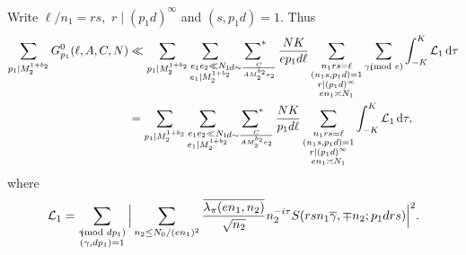 \documentclass[12pt,a4paper,twoside, reqno]{amsart}
\newcommand{\shortmod}{\ensuremath{\negthickspace \negthickspace \negthickspace \pmod}}
\newcommand{\sumstar}{\sideset{}{^*}\sum}
\begin{document}
Write  $\ell/n_1=rs, $ $r \mid (p_1d)^\infty$ and $(s,p_1d)=1$. Thus 
\begin{align}\label{Gp3}
       \sum_{p_1| M_2^{1+b_2}} G_{p_1}^0(\ell, A,C,N)  &\ll   \sum_{p_1| M_2^{1+b_2}}\mathop{\sum_{\substack {e_1e_2 \ll N_1 \\ e_1\mid M_2^{1+b_2} }   }}  \mathop{\sumstar_{ \substack{d \sim \frac{C}{A M_2^{b_2} e_2}
       } } }    \frac{ {N} K}{ep_1d  {\ell}} \mathop{\sum_{ \substack{n_1rs= \ell \\ (n_1s,p_1d)=1 \\ r | (p_1d)^\infty \\ en_1 \asymp N_1 }}} \sum_{\substack{ \gamma_1 \shortmod{e} }   }  \int_{-K}^K  \mathcal{L}_1 \,  \mathrm{d} \tau \notag \\
        &=\sum_{p_1| M_2^{1+b_2}} \mathop{\sum_{\substack {e_1e_2 \ll N_1 \\ e_1\mid M_2^{1+b_2} }   }}  \mathop{\sumstar_{ \substack{d \sim \frac{C}{A M_2^{b_2} e_2}
       } } }   \frac{ {N} K}{p_1d  {\ell}} \mathop{\sum_{ \substack{n_1rs= \ell \\ (n_1s,p_1d)=1 \\ r | (p_1d)^\infty \\ en_1 \asymp N_1  }}}    \int_{-K}^K  \mathcal{L}_1 \,  \mathrm{d} \tau,
\end{align}
where 
\begin{align*}
    \mathcal{L}_1= \sum_{\substack{ \gamma \shortmod{dp_1} \\ (\gamma, dp_1)=1 }   } \Big|   \sum_{n_2 \leq N_0/(en_1)^2}\frac{\overline{\lambda_\pi(en_1,n_2)}}{ \sqrt{n_2}  } n_2^{{-i \tau}}S(rsn_1 \overline{\gamma}, \mp n_2;p_1drs)    \Big|^2.
\end{align*}
\end{document}

